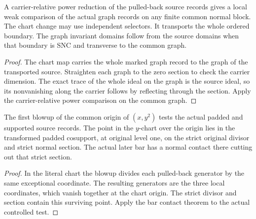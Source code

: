 \begin{theorem}
\label{hir:g1-normal-graph-chart-reduction}
\leanok
A carrier-relative power reduction of the pulled-back source
records gives a local weak comparison of the actual graph records
on any finite common normal block. The chart change may use
independent selectors. It transports the whole ordered boundary.
The graph invariant domains follow from the source domains when
that boundary is SNC and transverse to the common graph.
\end{theorem}
\begin{proof}
The chart map carries the whole marked graph record to the graph
of the transported source. Straighten each graph to the zero section
to check the carrier dimension. The exact trace of the whole ideal
on the graph is the source ideal, so its nonvanishing along the
carrier follows by reflecting through the section. Apply the
carrier-relative power comparison on the common graph.
\end{proof}

\begin{theorem}
\label{hir:g1-joint-example-later-positive-survivor}
\leanok
The first blowup of the common origin of $(x,y^2)$ tests the
actual padded and supported source records. The point in the
$y$-chart over the origin lies in the transformed padded
cosupport, at original level one, on the strict original
divisor and strict normal section. The actual later bar
has a normal contact there cutting out that strict section.
\end{theorem}
\begin{proof}
In the literal chart the blowup divides each pulled-back generator
by the same exceptional coordinate. The resulting generators
are the three local coordinates, which vanish together at the chart
origin. The strict divisor and section contain this surviving
point. Apply the bar contact theorem to the actual controlled test.
\end{proof}

